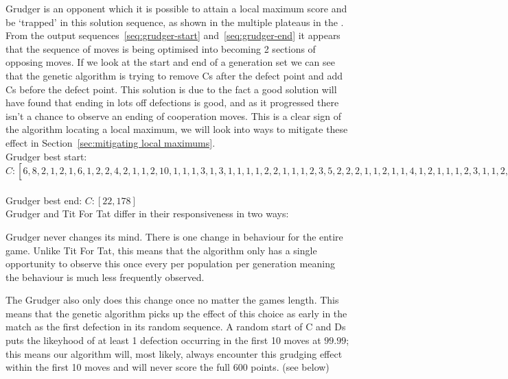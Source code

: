Grudger is an opponent which it is possible to attain a local maximum score and be `trapped' in this solution sequence, as shown in the multiple plateaus in the .
From the output sequences~\ref{seq:grudger-start} and~\ref{seq:grudger-end} it appears that the sequence of moves is being optimised into becoming 2 sections of opposing moves. 
If we look at the start and end of a generation set we can see that the genetic algorithm is trying to remove Cs after the defect point and add Cs before the defect point. 
This solution is due to the fact a good solution will have found that ending in lots off defections is good, and as it progressed there isn't a chance to observe an ending of cooperation moves. 
This is a clear sign of the algorithm locating a local maximum, we will look into ways to mitigate these effect in Section~\ref{sec:mitigating local maximums}.\\

Grudger best start: \(C:[6,8,2,1,2,1,6,1,2,2,4,2,1,1,2,10,1,1,1,3,1,3,1,1,1,1,2,2,1,1,1,2,3,5,2,2,2,1,1,2,1,1,4,1,2,1,1,1,2,3,1,1,2,2,1,7,3,2,1,2,3,1,1,5,(1)^10,4,1,1,1,1,4,2,1,1,3,1,1,2,3,4,1,1,3,2,4,2,1,2,3]\)\label{seq:grudger-start}\\ 


Grudger best end: \(C:[22,178]\)\label{seq:grudger-end}\\            

Grudger and Tit For Tat differ in their responsiveness in two ways: 
            
\begin{itemize}
    \begin{item}
        Grudger never changes its mind. There is one change in behaviour for the entire game. Unlike Tit For Tat, this means that the algorithm only has a single opportunity to observe this once every per population per generation meaning the behaviour is much less frequently observed.
    \end{item}
    \begin{item}
        The Grudger also only does this change once no matter the games length. This means that the genetic algorithm picks up the effect of this choice as early in the match as the first defection in its random sequence. A random start of C and Ds puts the likeyhood of at least 1 defection occurring in the first 10 moves at \(99.99\); this means our algorithm will, most likely, always encounter this grudging effect within the first 10 moves and will never score the full 600 points. (see below)
    \end{item}
\end{itemize}
            
